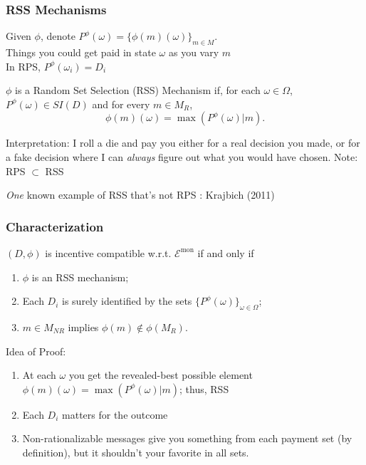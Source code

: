 
\begin{frame}
  \frametitle{RSS Mechanisms}
  Given $\phi$, denote $P^\phi(\omega)=\{\phi(m)(\omega)\}_{m\in M}$.\\
  Things you could get paid in state $\omega$ as you vary $m$\\
  In RPS, $P^\phi(\omega_i) = D_i$

  \bigskip

\begin{definition}
    $\phi$ is a Random Set Selection (RSS) Mechanism if, for each $\omega\in \Omega$, $P^\phi(\omega)\in SI(D)$ and for every $m\in M_R$,
    $$
        \phi(m)(\omega) = \max (P^\phi(\omega) | m).
    $$
\end{definition}
 \bigskip


  Interpretation: I roll a die and pay you either for a real decision you made, or for a fake decision where I can \emph{always} figure out what you would have chosen. Note: RPS $\subset$ RSS

  \bigskip

  \emph{One} known example of RSS that's not RPS : Krajbich (2011)
\end{frame}


\begin{frame}
  \frametitle{Characterization}
\begin{theorem}
     $(D,\phi)$ is incentive compatible w.r.t. $\mathcal{E}^\mathrm{mon}$ if and only if
    \begin{enumerate}
      \item $\phi$ is an RSS mechanism;
      \item Each $D_i$ is surely identified by the sets $\{P^\phi(\omega)\}_{\omega\in\Omega}$;
      \item $m\in M_{NR}$ implies $\phi(m)\not\in \phi(M_R)$.
    \end{enumerate}
\end{theorem}

\bigskip

Idea of Proof:
\begin{enumerate}
 \item At each $\omega$ you get the revealed-best possible element\\ $\phi(m)(\omega)=\max(P^\phi(\omega)|m)$; thus, RSS
 \item Each $D_i$ matters for the outcome
 \item Non-rationalizable messages give you something from each payment set (by definition), but it shouldn't your favorite in all sets.
\end{enumerate}

\end{frame}

